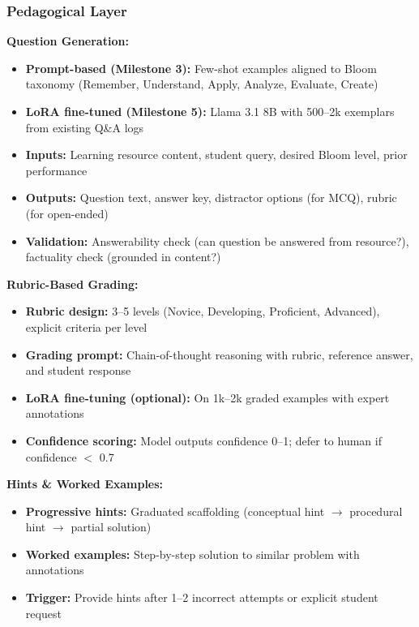 \documentclass[11pt,letterpaper]{article}
\begin{document}
\subsubsection{Pedagogical Layer}\label{subsubsec:pedagogical-layer}

\textbf{Question Generation:}
\begin{itemize}
\item \textbf{Prompt-based (Milestone 3):} Few-shot examples aligned to Bloom taxonomy (Remember, Understand, Apply, Analyze, Evaluate, Create)
\item \textbf{LoRA fine-tuned (Milestone 5):} Llama 3.1 8B with 500--2k exemplars from existing Q\&A logs
\item \textbf{Inputs:} Learning resource content, student query, desired Bloom level, prior performance
\item \textbf{Outputs:} Question text, answer key, distractor options (for MCQ), rubric (for open-ended)
\item \textbf{Validation:} Answerability check (can question be answered from resource?), factuality check (grounded in content?)
\end{itemize}

\textbf{Rubric-Based Grading:}
\begin{itemize}
\item \textbf{Rubric design:} 3--5 levels (Novice, Developing, Proficient, Advanced), explicit criteria per level
\item \textbf{Grading prompt:} Chain-of-thought reasoning with rubric, reference answer, and student response
\item \textbf{LoRA fine-tuning (optional):} On 1k--2k graded examples with expert annotations
\item \textbf{Confidence scoring:} Model outputs confidence 0--1; defer to human if confidence $<$ 0.7
\end{itemize}

\textbf{Hints \& Worked Examples:}
\begin{itemize}
\item \textbf{Progressive hints:} Graduated scaffolding (conceptual hint $\rightarrow$ procedural hint $\rightarrow$ partial solution)
\item \textbf{Worked examples:} Step-by-step solution to similar problem with annotations
\item \textbf{Trigger:} Provide hints after 1--2 incorrect attempts or explicit student request
\end{itemize}
\end{document}

